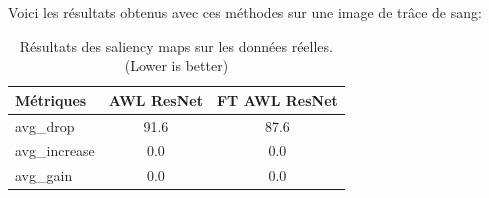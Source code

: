 Voici les résultats obtenus avec ces méthodes sur une image de trâce de sang:

\begin{table}[h]
    \centering
    \begin{tabular}{lcc}
        \toprule
        Métriques & AWL ResNet & FT AWL ResNet \\
        \midrule
        avg\_drop & 91.6 & 87.6 \\
        avg\_increase & 0.0 & 0.0 \\
        avg\_gain & 0.0 & 0.0 \\
        \bottomrule
        \end{tabular}
    \caption{Résultats des saliency maps sur les données réelles. (Lower is better)}
    \label{tab:saliency_results}
\end{table}
